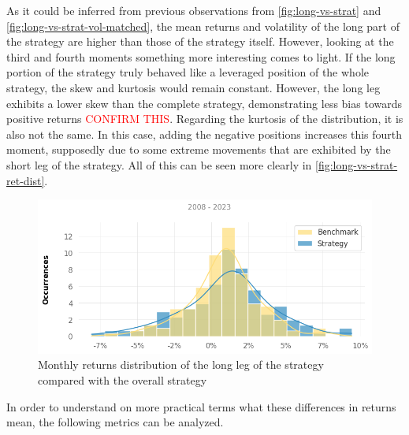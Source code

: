 As it could be inferred from previous observations from \autoref{fig:long-vs-strat} and \autoref{fig:long-vs-strat-vol-matched}, the mean returns and volatility of the long part of the strategy are higher than those of the strategy itself. However, looking at the third and fourth moments something more interesting comes to light. If the long portion of the strategy truly behaved like a leveraged position of the whole strategy, the skew and kurtosis would remain constant. However, the long leg exhibits a lower skew than the complete strategy, demonstrating less bias towards positive returns \textcolor{red}{CONFIRM THIS}. Regarding the kurtosis of the distribution, it is also not the same. In this case, adding the negative positions increases this fourth moment, supposedly due to some extreme movements that are exhibited by the short leg of the strategy. All of this can be seen more clearly in \autoref{fig:long-vs-strat-ret-dist}.

\begin{figure}[ht]
    \includegraphics[width=\linewidth]{assets/long-vs-strat-ret-dist.png}
    \caption{Monthly returns distribution of the long leg of the strategy compared with the overall strategy}
    \label{fig:long-vs-strat-ret-dist}
\end{figure}

In order to understand on more practical terms what these differences in returns mean, the following metrics can be analyzed.


